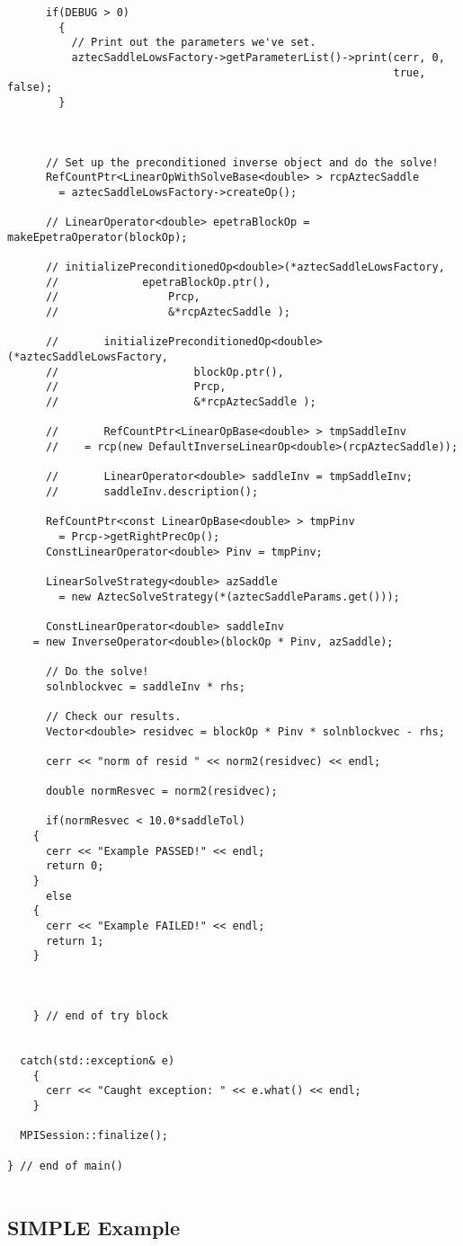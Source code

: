 \begin{verbatim}
      if(DEBUG > 0)
        {
          // Print out the parameters we've set.
          aztecSaddleLowsFactory->getParameterList()->print(cerr, 0, 
                                                            true, false);
        }



      // Set up the preconditioned inverse object and do the solve!
      RefCountPtr<LinearOpWithSolveBase<double> > rcpAztecSaddle 
        = aztecSaddleLowsFactory->createOp();

      // LinearOperator<double> epetraBlockOp = makeEpetraOperator(blockOp);

      // initializePreconditionedOp<double>(*aztecSaddleLowsFactory, 
      //			 epetraBlockOp.ptr(), 
      //				 Prcp,
      //				 &*rcpAztecSaddle );

      //       initializePreconditionedOp<double>(*aztecSaddleLowsFactory, 
      // 					 blockOp.ptr(), 
      // 					 Prcp,
      // 					 &*rcpAztecSaddle );
      
      //       RefCountPtr<LinearOpBase<double> > tmpSaddleInv 
      // 	= rcp(new DefaultInverseLinearOp<double>(rcpAztecSaddle));
      
      //       LinearOperator<double> saddleInv = tmpSaddleInv;
      //       saddleInv.description();

      RefCountPtr<const LinearOpBase<double> > tmpPinv 
        = Prcp->getRightPrecOp();
      ConstLinearOperator<double> Pinv = tmpPinv;

      LinearSolveStrategy<double> azSaddle 
        = new AztecSolveStrategy(*(aztecSaddleParams.get()));

      ConstLinearOperator<double> saddleInv 
	= new InverseOperator<double>(blockOp * Pinv, azSaddle);

      // Do the solve!
      solnblockvec = saddleInv * rhs;

      // Check our results.
      Vector<double> residvec = blockOp * Pinv * solnblockvec - rhs;

      cerr << "norm of resid " << norm2(residvec) << endl;
      
      double normResvec = norm2(residvec);

      if(normResvec < 10.0*saddleTol)
	{
	  cerr << "Example PASSED!" << endl;
	  return 0;
	}
      else
	{
	  cerr << "Example FAILED!" << endl;
	  return 1;
	}



    } // end of try block


  catch(std::exception& e)
    {
      cerr << "Caught exception: " << e.what() << endl;
    }

  MPISession::finalize();

} // end of main()


\end{verbatim}



\subsection{SIMPLE Example}
